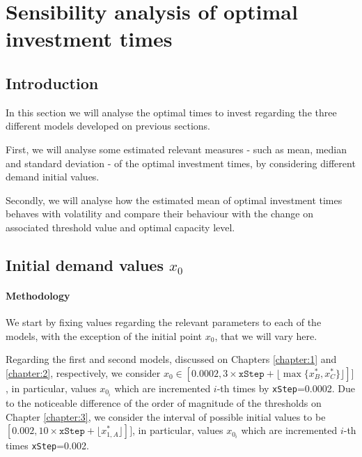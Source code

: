 \chapter{Sensibility analysis of optimal investment times}
\label{chapter:stoptime}



\section{Introduction}
\label{section:stoptime_intro}

In this section we will analyse the optimal times to invest regarding the three different models developed on previous sections.

First, we will analyse some estimated relevant measures - such as mean, median and standard deviation - of the optimal investment times, by considering different demand initial values.

Secondly, we will analyse how the estimated mean of optimal investment times behaves with volatility and compare their behaviour with the change on associated threshold value and optimal capacity level.

\section{Initial demand values $x_0$}
\label{section:x0}

\subsubsection{Methodology}

We start by fixing values regarding the relevant parameters to each of the models, with the exception of the initial point $x_0$, that we will vary here.

Regarding the first and second models, discussed on Chapters \ref{chapter:1} and \ref{chapter:2}, respectively, we consider $x_0 \in [0.0002, 3 \times  \texttt{xStep} + \lfloor \max{ \{ x_B^*, x_C^* \} } \rfloor]  ]$, in particular, values $x_{0_i}$ which are incremented $i$-th times by \texttt{xStep}=0.0002. Due to the noticeable difference of the order of magnitude of the thresholds on Chapter \ref{chapter:3}, we consider the interval of possible initial values to be $[0.002, 10 \times \texttt{xStep} +  \lfloor  x_{1,A}^* \rfloor] ]$, in particular, values $x_{0_i}$ which are incremented $i$-th times \texttt{xStep}=0.002.
		
